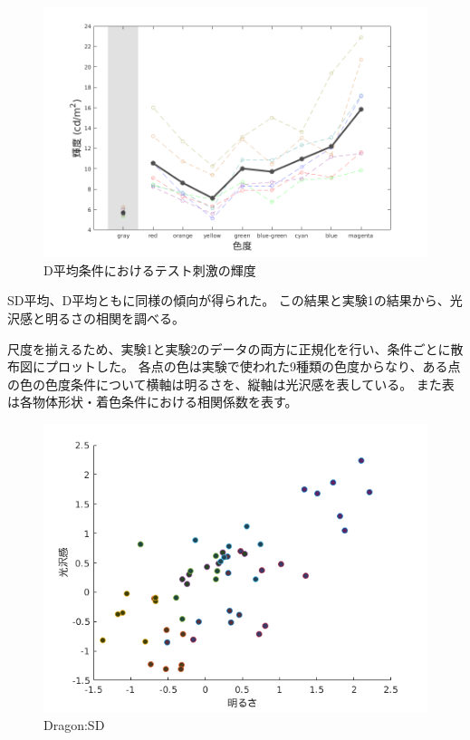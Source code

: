     \begin{figure}[h]
        \centering
        \includegraphics[width=14.0cm]{./img/ex2_res_SD_p.png}
        \caption{D平均条件におけるテスト刺激の輝度}
        \label{ex2_D}
    \end{figure}

    SD平均、D平均ともに同様の傾向が得られた。
    この結果と実験1の結果から、光沢感と明るさの相関を調べる。

    尺度を揃えるため、実験1と実験2のデータの両方に正規化を行い、条件ごとに散布図にプロットした。
    各点の色は実験で使われた9種類の色度からなり、ある点の色の色度条件について横軸は明るさを、縦軸は光沢感を表している。
    また表は各物体形状・着色条件における相関係数を表す。

    \begin{figure}[h]
        \centering
        \includegraphics[width=12.0cm]{./img/ex3_DSD.png}
        \caption{Dragon:SD}
        \label{ex3_DSD}
    \end{figure}

